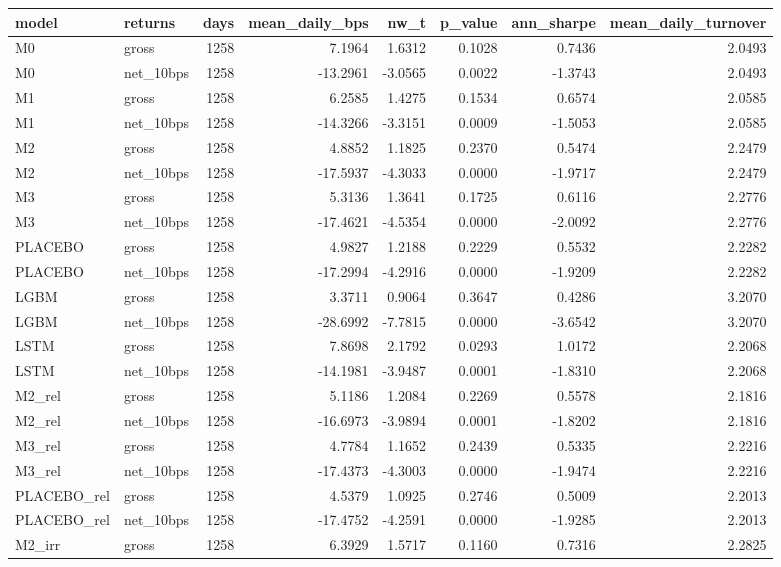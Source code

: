 \begin{tabular}{llrrrrrr}
\toprule
model & returns & days & mean\_daily\_bps & nw\_t & p\_value & ann\_sharpe & mean\_daily\_turnover \\
\midrule
M0 & gross & 1258 & 7.1964 & 1.6312 & 0.1028 & 0.7436 & 2.0493 \\
M0 & net\_10bps & 1258 & -13.2961 & -3.0565 & 0.0022 & -1.3743 & 2.0493 \\
M1 & gross & 1258 & 6.2585 & 1.4275 & 0.1534 & 0.6574 & 2.0585 \\
M1 & net\_10bps & 1258 & -14.3266 & -3.3151 & 0.0009 & -1.5053 & 2.0585 \\
M2 & gross & 1258 & 4.8852 & 1.1825 & 0.2370 & 0.5474 & 2.2479 \\
M2 & net\_10bps & 1258 & -17.5937 & -4.3033 & 0.0000 & -1.9717 & 2.2479 \\
M3 & gross & 1258 & 5.3136 & 1.3641 & 0.1725 & 0.6116 & 2.2776 \\
M3 & net\_10bps & 1258 & -17.4621 & -4.5354 & 0.0000 & -2.0092 & 2.2776 \\
PLACEBO & gross & 1258 & 4.9827 & 1.2188 & 0.2229 & 0.5532 & 2.2282 \\
PLACEBO & net\_10bps & 1258 & -17.2994 & -4.2916 & 0.0000 & -1.9209 & 2.2282 \\
LGBM & gross & 1258 & 3.3711 & 0.9064 & 0.3647 & 0.4286 & 3.2070 \\
LGBM & net\_10bps & 1258 & -28.6992 & -7.7815 & 0.0000 & -3.6542 & 3.2070 \\
LSTM & gross & 1258 & 7.8698 & 2.1792 & 0.0293 & 1.0172 & 2.2068 \\
LSTM & net\_10bps & 1258 & -14.1981 & -3.9487 & 0.0001 & -1.8310 & 2.2068 \\
M2\_rel & gross & 1258 & 5.1186 & 1.2084 & 0.2269 & 0.5578 & 2.1816 \\
M2\_rel & net\_10bps & 1258 & -16.6973 & -3.9894 & 0.0001 & -1.8202 & 2.1816 \\
M3\_rel & gross & 1258 & 4.7784 & 1.1652 & 0.2439 & 0.5335 & 2.2216 \\
M3\_rel & net\_10bps & 1258 & -17.4373 & -4.3003 & 0.0000 & -1.9474 & 2.2216 \\
PLACEBO\_rel & gross & 1258 & 4.5379 & 1.0925 & 0.2746 & 0.5009 & 2.2013 \\
PLACEBO\_rel & net\_10bps & 1258 & -17.4752 & -4.2591 & 0.0000 & -1.9285 & 2.2013 \\
M2\_irr & gross & 1258 & 6.3929 & 1.5717 & 0.1160 & 0.7316 & 2.2825 \\

\end{tabular}

